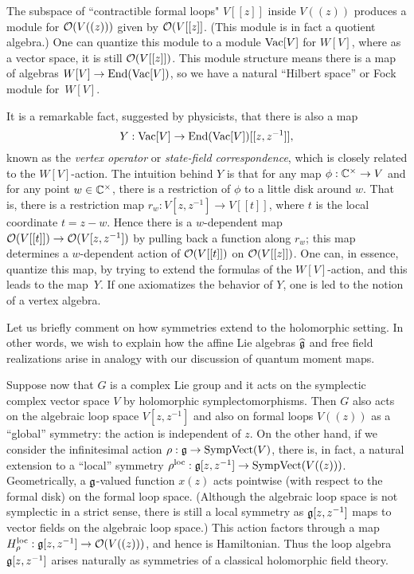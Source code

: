 \documentclass[11pt]{amsart}
\begin{document}
The subspace of ``contractible formal loops" $V[[z]]$ inside $V((z))$ produces a module for $\mathcal O(V((z)))$ given by $\mathcal O(V[[z]]$. 
(This module is in fact a quotient algebra.)
One can quantize this module to a module ${\rm Vac}[V]$ for $W[V]$,
where as a vector space, it is still $\mathcal O(V[[z]])$.
This module structure means there is a map of algebras $W[V] \to {\rm End}({\rm Vac}[V])$,
so we have a natural ``Hilbert space'' or Fock module for~$W[V]$.

It is a remarkable fact, suggested by physicists, that there is also a map
\[
Y: {\rm Vac}[V] \to {\rm End}({\rm Vac}[V])[[z, z^{-1}]],
\]
known as the {\em vertex operator} or {\em state-field correspondence},
which is closely related to the $W[V]$-action.
The intuition behind $Y$ is that for any map $\phi: \mathbb C^\times \to V$ and for any point $w \in \mathbb C^\times$, 
there is a restriction of $\phi$ to a little disk around $w$.
That is, there is a restriction map $r_w: V[z,z^{-1}] \to V[[t]]$, where $t$ is the local coordinate $t = z-w$.
Hence there is a $w$-dependent map $\mathcal O(V[[t]]) \to \mathcal O(V[z,z^{-1}])$ by pulling back a function along $r_w$;
this map determines a $w$-dependent action of $\mathcal O(V[[t]])$ on $\mathcal O(V[[z]])$.
One can, in essence, quantize this map, by trying to extend the formulas of the $W[V]$-action,
and this leads to the map~$Y$.
If one axiomatizes the behavior of $Y$, one is led to the notion of a vertex algebra.

Let us briefly comment on how symmetries extend to the holomorphic setting.
In other words, we wish to explain how the affine Lie algebras $\widehat{\mathfrak g}$ and free field realizations arise in analogy with our discussion of quantum moment maps.

Suppose now that $G$ is a complex Lie group and it acts on the symplectic complex vector space $V$ by holomorphic symplectomorphisms.
Then $G$ also acts on the algebraic loop space $V[z,z^{-1}]$ and also on formal loops $V((z))$ as a ``global'' symmetry:
the action is independent of $z$.
On the other hand, if we consider the infinitesimal action $\rho: \mathfrak g \to {\rm SympVect}(V)$,
there is, in fact, a natural extension to a ``local'' symmetry $\rho^{\rm loc}: \mathfrak g[z,z^{-1}] \to {\rm SympVect}(V((z)))$.
Geometrically, a $\mathfrak g$-valued function $x(z)$ acts pointwise (with respect to the formal disk) on the formal loop space.
(Although the algebraic loop space is not symplectic in a strict sense,
there is still a local symmetry as $\mathfrak g[z,z^{-1}]$ maps to vector fields on the algebraic loop space.)
This action factors through a map $H_\rho^{\rm loc}: \mathfrak g[z,z^{-1}] \to \mathcal O(V((z)))$,
and hence is Hamiltonian.
Thus the loop algebra $\mathfrak g[z,z^{-1}]$ arises naturally as symmetries of a classical holomorphic field theory.
\end{document}

